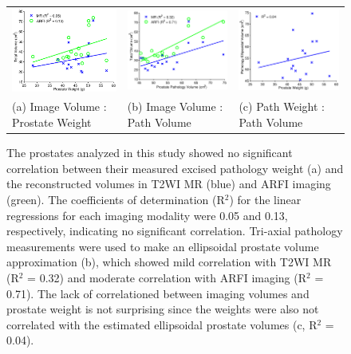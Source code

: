 \begin{figure}[htb!]
\centering
\begin{tabular}{lll}
\includegraphics[width=0.3\linewidth]{figs/corr_weight_vol.pdf} &
\includegraphics[width=0.3\linewidth]{figs/corr_pathVol_vol.pdf} &
\includegraphics[width=0.3\linewidth]{figs/corr_path_vol_weight_vol.pdf} \\
(a) Image Volume : Prostate Weight & (b) Image Volume : Path Volume & (c) Path Weight : Path Volume \\
\end{tabular}
\caption{The prostates analyzed in this study showed no significant correlation
    between their measured excised pathology weight (a) and the reconstructed
    volumes in T2WI MR (blue) and ARFI imaging (green).  The coefficients of
    determination (R$^2$) for the linear regressions for each imaging modality
    were 0.05 and 0.13, respectively, indicating no significant correlation.
    Tri-axial pathology measurements were used to make an ellipsoidal prostate
    volume approximation (b), which showed mild correlation with T2WI MR (R$^2$
    = 0.32) and moderate correlation with ARFI imaging (R$^2$ = 0.71).  The
    lack of correlationed between imaging volumes and prostate weight is not
    surprising since the weights were also not correlated with the estimated
    ellipsoidal prostate volumes (c, R$^2$ = 0.04).} 
\label{fig:mr_arfi_weight}
\end{figure}
